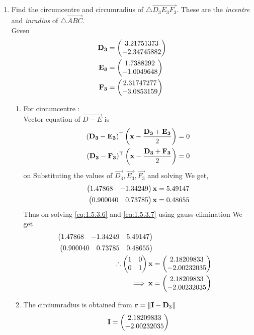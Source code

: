 \documentclass[10pt]{book}
\begin{document}
\begin{enumerate}[label=\thesection.\arabic*.,ref=\thesection.\theenumi]
\item Find the circumcentre and circumradius of $\triangle \vec{D_3E_3F_3}$.  These are the {\em incentre} and {\em inradius} of $\triangle \vec{ABC}$. \\
\solution 
Given\\ 
\begin{align}
    \mathbf{D_3} &= \begin{pmatrix}3.21751373 \\ -2.34745882\end{pmatrix} \\
    \mathbf{E_3} &= \begin{pmatrix}1.7388292 \\ -1.0049648\end{pmatrix} \\
    \mathbf{F_3} &= \begin{pmatrix}2.31747277 \\ -3.0853159 \end{pmatrix} 
\end{align}
\begin{enumerate}
\item For circumcentre :\\
Vector equation of $\vec{D-E}$ is
\begin{align}
(\mathbf{D_3}-\mathbf{E_3})^\top\left( \mathbf{x} - \frac{\mathbf{D_3}+\mathbf{E_3}}{2}\right) = 0 \\
(\mathbf{D_3}-\mathbf{F_3})^\top\left( \mathbf{x} - \frac{\mathbf{D_3}+\mathbf{F_3}}{2}\right) = 0
\end{align}
on Substituting the values of $\vec{D_3}, \vec{E_3}, \vec{F_3}$ and solving We get,
\begin{align}
     \myvec{1.47868 & -1.34249}\vec{x} &= 5.49147 \label{eq:1.5.3.6} \\
     \myvec{0.900040 & 0.73785}\vec{x} &=0.48655 \label{eq:1.5.3.7}
\end{align}
Thus on solving \eqref{eq:1.5.3.6} and \eqref{eq:1.5.3.7} using gauss elimination We get
\begin{align}
    \begin{pmatrix}1.47868 & -1.34249 & 5.49147 \end{pmatrix} \\
    \begin{pmatrix}0.900040 & 0.73785 & 0.48655 \end{pmatrix} \\
    \therefore \begin{pmatrix}1&0\\0&1\end{pmatrix}\mathbf{x} &= \begin{pmatrix}2.18209833 \\ -2.00232035\end{pmatrix}\\
\implies \mathbf{x}&=\begin{pmatrix}2.18209833 \\ -2.00232035\end{pmatrix}
\end{align}
\item The circiumradius is obtained from  $ \mathbf{r}=\left\lVert\mathbf{I}-\mathbf{D}_3\right\rVert$
   \begin{align}
       \vec{I}&=\myvec{2.18209833 \\ -2.00232035} \\

\end{align}
\end{enumerate}
\end{enumerate}
\end{document}
